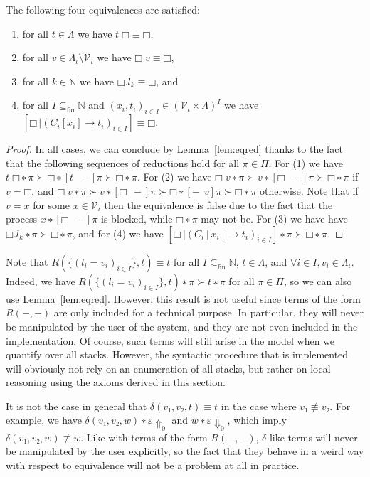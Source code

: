 \begin{theorem}
  The following four equivalences are satisfied:
  \begin{enumerate}[topsep=0pt,itemsep=0ex]
    \item for all $t ∈ Λ$ we have $t\;□ ≡ □$,
    \item for all $v ∈ Λ_{ι} \setminus \mathcal{V}_{ι}$ we have $□\;v ≡ □$,
    \item for all $k ∈ \mathbb{N}$ we have $□.l_k ≡ □$, and
    \item for all $I ⊆_\text{fin} \mathbb{N}$ and
          $(x_i, t_i)_{i∈I} ∈ (\mathcal{V}_{ι} × Λ)^I$
          we have $[□\,| (C_i[x_i] → t_i)_{i∈I}] ≡ □$.
  \end{enumerate}
\end{theorem}
\begin{proof}
  In all cases, we can conclude by Lemma~\ref{lem:eqred} thanks to the fact
  that the following sequences of reductions hold for all $π ∈ Π$.
  For (1) we have ${t\;□ ∗ π} ≻ {□ ∗ [t\;\,{-}]π} ≻ {□ ∗ π}$.
  For (2) we have ${□\;v ∗ π} ≻ {v ∗ [□\;\,{-}]π} ≻ {□ ∗ π}$ if $v = □$, and
  ${□\;v ∗ π} ≻ {v ∗ [□\;\,{-}]π} ≻ {□ ∗ [{-}\;\,v]π} ≻ {□ ∗ π}$ otherwise.
  Note that if $v = x$ for some $x ∈ \mathcal{V}_{ι}$ then the equivalence is
  false due to the fact that the process ${x ∗ [□\;\,{-}]π}$ is blocked,
  while ${□ ∗ π}$ may not be.
  For (3) we have have ${□.l_k ∗ π} ≻ {□ ∗ π}$,
  and for (4) we have ${[□\,| (C_i[x_i] → t_i)_{i∈I}] ∗ π} ≻ {□ ∗ π}$.
\end{proof}

\begin{remark}
  Note that $R(\{(l_i = v_i)_{i∈I}\},t) ≡ t$ for all $I ⊆_\text{fin}
  \mathbb{N}$, $t ∈ Λ$, and $∀i∈I, v_i ∈ Λ_{ι}$. Indeed, we have
  ${R(\{(l_i = v_i)_{i∈I}\},t) ∗ π} ≻ {t ∗ π}$ for all $π ∈ Π$, so we
  can also use Lemma~\ref{lem:eqred}. However, this result is not
  useful since terms of the form $R({-},{-})$ are only included for a
  technical purpose. In particular, they will never be manipulated by
  the user of the system, and they are not even included in the
  implementation. Of course, such terms will still arise in the
  model when we quantify over all stacks. However, the syntactic procedure
  that is implemented will obviously not rely on an enumeration of all
  stacks, but rather on local reasoning using the axioms derived in this
  section.
\end{remark}
\begin{remark}
  It is not the case in general that $δ(v₁,v₂,t) ≡ t$ in the case where
  $v₁ \not\equiv v₂$. For example, we have ${δ(v₁,v₂,w) ∗ ε} {⇑}_0$ and
  ${w ∗ ε} {⇓}_0$, which imply $δ(v₁,v₂,w) \not\equiv w$. Like with terms
  of the form $R({-},{-})$, $δ$-like terms will never be manipulated by
  the user explicitly, so the fact that they behave in a weird way with
  respect to equivalence will not be a problem at all in practice.
\end{remark}

